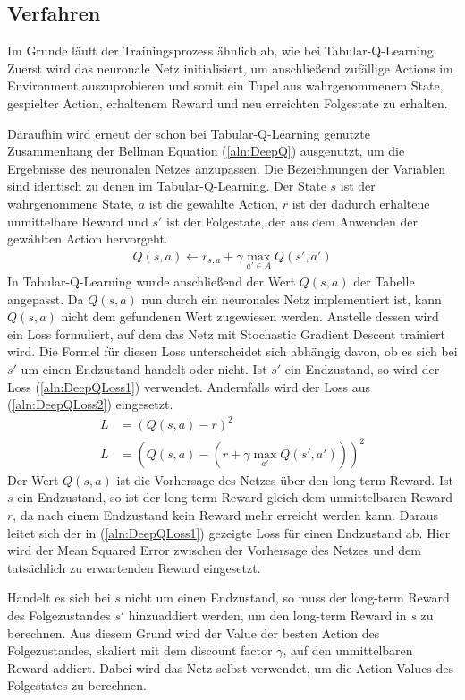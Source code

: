 \documentclass[11pt]{scrartcl}
\begin{document}
\subsection{Verfahren}
\label{sec:deepq-procedure}
Im Grunde läuft der Trainingsprozess ähnlich ab, wie bei Tabular-Q-Learning. Zuerst wird
das neuronale Netz initialisiert, um anschließend zufällige Actions im Environment
auszuprobieren und somit ein Tupel aus wahrgenommenem State, gespielter Action, erhaltenem
Reward und neu erreichten Folgestate zu erhalten.

Daraufhin wird erneut der schon bei Tabular-Q-Learning genutzte Zusammenhang der Bellman
Equation (\ref{aln:DeepQ}) ausgenutzt, um die Ergebnisse des neuronalen Netzes anzupassen.
Die Bezeichnungen der Variablen sind identisch zu denen im Tabular-Q-Learning. Der State
$s$ ist der wahrgenommene State, $a$ ist die gewählte Action, $r$ ist der dadurch
erhaltene unmittelbare Reward und $s'$ ist der Folgestate, der aus dem Anwenden der
gewählten Action hervorgeht.
\begin{align}
  Q(s, a) \leftarrow r_{s,a} + \gamma \max_{a' \in A}Q(s', a') \label{aln:DeepQ}
\end{align}
\noindent
In Tabular-Q-Learning wurde anschließend der Wert $Q(s, a)$ der Tabelle angepasst. Da 
$Q(s, a)$ nun durch ein neuronales Netz implementiert ist, kann $Q(s, a)$ nicht dem
gefundenen Wert zugewiesen werden. Anstelle dessen wird ein Loss formuliert, auf dem
das Netz mit Stochastic Gradient Descent trainiert wird. Die Formel für diesen Loss
unterscheidet sich abhängig davon, ob es sich bei $s'$ um einen Endzustand handelt oder
nicht. Ist $s'$ ein Endzustand, so wird der Loss (\ref{aln:DeepQLoss1}) verwendet.
Andernfalls wird der Loss aus (\ref{aln:DeepQLoss2}) eingesetzt.
\begin{align}
  L & = \left(Q(s, a) - r\right)^2 \label{aln:DeepQLoss1} \\
  L & = \left(Q(s, a) - \left(r + \gamma \max_{a'} Q(s', a')\right)\right)^2 \label{aln:DeepQLoss2}
\end{align}
\noindent
Der Wert $Q(s, a)$ ist die Vorhersage des Netzes über den long-term Reward. Ist $s$ ein
Endzustand, so ist der long-term Reward gleich dem unmittelbaren Reward $r$, da nach einem
Endzustand kein Reward mehr erreicht werden kann. Daraus leitet sich der in
(\ref{aln:DeepQLoss1}) gezeigte Loss für einen Endzustand ab. Hier wird der Mean Squared
Error zwischen der Vorhersage des Netzes und dem tatsächlich zu erwartenden Reward
eingesetzt.

Handelt es sich bei $s$ nicht um einen Endzustand, so muss der long-term Reward des
Folgezustandes $s'$ hinzuaddiert werden, um den long-term Reward in $s$ zu berechnen. Aus
diesem Grund wird der Value der besten Action des Folgezustandes, skaliert mit dem
discount factor $\gamma$, auf den unmittelbaren Reward addiert. Dabei wird das Netz selbst
verwendet, um die Action Values des Folgestates zu berechnen.
\end{document}
